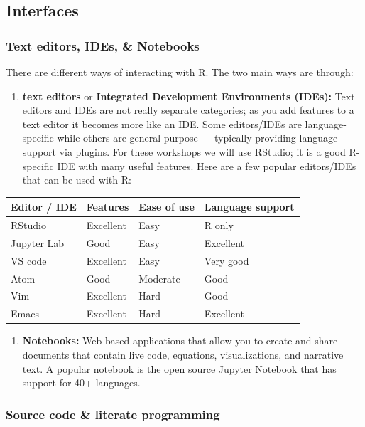 \documentclass[]{book}
\providecommand{\tightlist}{%
  \setlength{\itemsep}{0pt}\setlength{\parskip}{0pt}}
\begin{document}
\subsection{Interfaces}\label{interfaces}

\subsubsection{Text editors, IDEs, \&
Notebooks}\label{text-editors-ides-notebooks}

There are different ways of interacting with R. The two main ways are
through:

\begin{enumerate}
\def\labelenumi{\arabic{enumi}.}
\tightlist
\item
  \textbf{text editors} or \textbf{Integrated Development Environments
  (IDEs):} Text editors and IDEs are not really separate categories; as
  you add features to a text editor it becomes more like an IDE. Some
  editors/IDEs are language-specific while others are general purpose
  --- typically providing language support via plugins. For these
  workshops we will use \href{https://rstudio.com/}{RStudio}; it is a
  good R-specific IDE with many useful features. Here are a few popular
  editors/IDEs that can be used with R:
\end{enumerate}

\begin{longtable}[]{@{}llll@{}}
\toprule
Editor / IDE & Features & Ease of use & Language support\tabularnewline
\midrule
\endhead
RStudio & Excellent & Easy & R only\tabularnewline
Jupyter Lab & Good & Easy & Excellent\tabularnewline
VS code & Excellent & Easy & Very good\tabularnewline
Atom & Good & Moderate & Good\tabularnewline
Vim & Excellent & Hard & Good\tabularnewline
Emacs & Excellent & Hard & Excellent\tabularnewline
\bottomrule
\end{longtable}

\begin{enumerate}
\def\labelenumi{\arabic{enumi}.}
\setcounter{enumi}{1}
\tightlist
\item
  \textbf{Notebooks:} Web-based applications that allow you to create
  and share documents that contain live code, equations, visualizations,
  and narrative text. A popular notebook is the open source
  \href{https://jupyter.org/}{Jupyter Notebook} that has support for 40+
  languages.
\end{enumerate}

\subsubsection{Source code \& literate
programming}\label{source-code-literate-programming}
\end{document}
